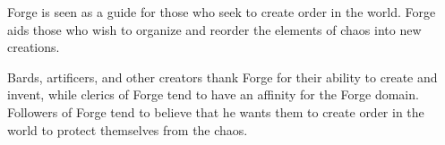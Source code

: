 Forge is seen as a guide for those who seek to create order in the world.
Forge aids those who wish to organize and reorder the elements of chaos into new creations.

Bards, artificers, and other creators thank Forge for their ability to create and invent, while clerics of Forge tend to have an affinity for the Forge domain.
Followers of Forge tend to believe that he wants them to create order in the world to protect themselves from the chaos.
